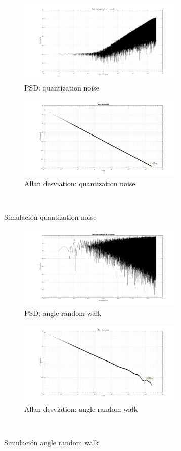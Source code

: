 \documentclass[a4paper,11pt,twoside]{IT-CNEA}
\begin{document}
\begin{figure}[t!]
    \centering
    \begin{subfigure}[t]{0.5\textwidth}
        \centering
        \includegraphics[width=8cm]{Figuras/PSDQuantizationNoise.png}
        \caption{PSD: quantization noise}
        \label{fig:}
    \end{subfigure}%
    \begin{subfigure}[t]{0.5\textwidth}
        \centering
        \includegraphics[width=8cm]{Figuras/AllanQuantizationNoise.png}
        \caption{Allan desviation: quantization noise}
        \label{fig:}
    \end{subfigure}%
    ~ 
    \caption{Simulación quantization noise}
    \label{fig:simulacionquantizationNoise}
\end{figure}
\begin{figure}[t!]
    \centering
    \begin{subfigure}[t]{0.5\textwidth}
        \centering
        \includegraphics[width=8cm]{Figuras/PSDARW.png}
        \caption{PSD: angle random walk}
        \label{fig:}
    \end{subfigure}%
    \begin{subfigure}[t]{0.5\textwidth}
        \centering
        \includegraphics[width=8cm]{Figuras/AllanARW.png}
        \caption{Allan desviation: angle random walk}
        \label{fig:}
    \end{subfigure}%
    ~ 
    \caption{Simulación angle random walk}
    \label{fig:simulacionARW}
\end{figure}
\end{document}
